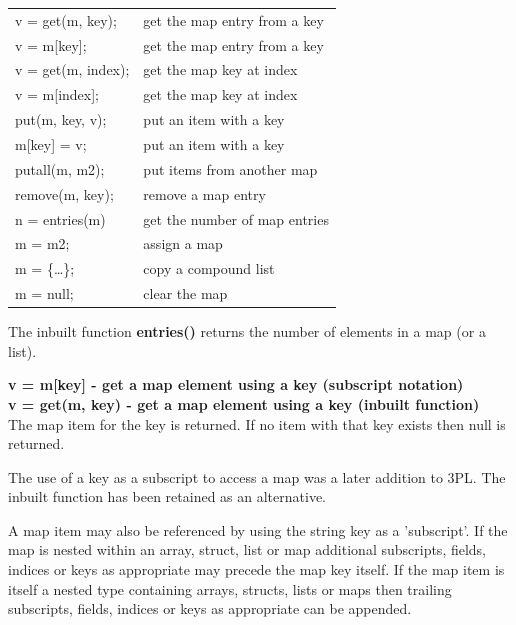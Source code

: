             \begin{tabular}{| l | l |}
            \hline
            v = get(m, key);    & get the map entry from a key \\
            v = m[key];         & get the map entry from a key \\
            v = get(m, index);  & get the map key at index \\
            v = m[index];       & get the map key at index \\
            put(m, key, v);     & put an item with a key \\
            m[key] = v;         & put an item with a key \\
            putall(m, m2);      & put items from another map \\
            remove(m, key);     & remove a map entry \\
            n = entries(m)      & get the number of map entries \\
            \hline
            m = m2;             & assign a map \\
            m = \{\dots\};      & copy a compound list \\
            m = null;           & clear the map \\
            \hline
            \end{tabular}

            The inbuilt function {\bf entries()} returns the number of elements in
            a map (or a list).

            
            {\bf v = m[key] - get a map element using a key (subscript notation)}\\
            {\bf v = get(m, key) - get a map element using a key (inbuilt function)}\\
           
            The map item for the key is returned.
            If no item with that key exists then null is returned.
            
            The use of a key as a subscript to access a map was a later addition
            to 3PL. The inbuilt function has been retained as an alternative.
            
            A map item may also be referenced by using the string key
            as a 'subscript'. If the map is nested within an array, struct, list
            or map additional subscripts, fields, indices or keys as appropriate may
            precede the map key itself. If the map item is itself a nested
            type containing arrays, structs, lists or maps then trailing
            subscripts, fields, indices or keys as appropriate can be appended.

